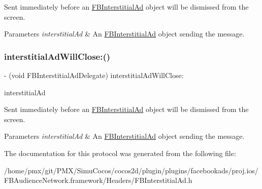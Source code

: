 Sent immediately before an \hyperlink{interfaceFBInterstitialAd}{F\+B\+Interstitial\+Ad} object will be dismissed from the screen.


\begin{DoxyParams}{Parameters}
{\em interstitial\+Ad} & An \hyperlink{interfaceFBInterstitialAd}{F\+B\+Interstitial\+Ad} object sending the message. \\
\hline
\end{DoxyParams}
\mbox{\label{protocolFBInterstitialAdDelegate_01-p_a9552e934440e2bbb01f09b7eb2e3a5a3}} 
\subsubsection{\texorpdfstring{interstitial\+Ad\+Will\+Close\+:()}{interstitialAdWillClose:()}\hspace{0.1cm}{\footnotesize\ttfamily [5/5]}}
{\footnotesize\ttfamily -\/ (void F\+B\+Interstitial\+Ad\+Delegate) interstitial\+Ad\+Will\+Close\+: \begin{DoxyParamCaption}\item[{(\hyperlink{interfaceFBInterstitialAd}{F\+B\+Interstitial\+Ad} $\ast$)}]{interstitial\+Ad }\end{DoxyParamCaption}\hspace{0.3cm}{\ttfamily [optional]}}

Sent immediately before an \hyperlink{interfaceFBInterstitialAd}{F\+B\+Interstitial\+Ad} object will be dismissed from the screen.


\begin{DoxyParams}{Parameters}
{\em interstitial\+Ad} & An \hyperlink{interfaceFBInterstitialAd}{F\+B\+Interstitial\+Ad} object sending the message. \\
\hline
\end{DoxyParams}


The documentation for this protocol was generated from the following file\+:\begin{DoxyCompactItemize}
\item 
/home/pmx/git/\+P\+M\+X/\+Simu\+Cocos/cocos2d/plugin/plugins/facebookads/proj.\+ios/\+F\+B\+Audience\+Network.\+framework/\+Headers/F\+B\+Interstitial\+Ad.\+h\end{DoxyCompactItemize}
